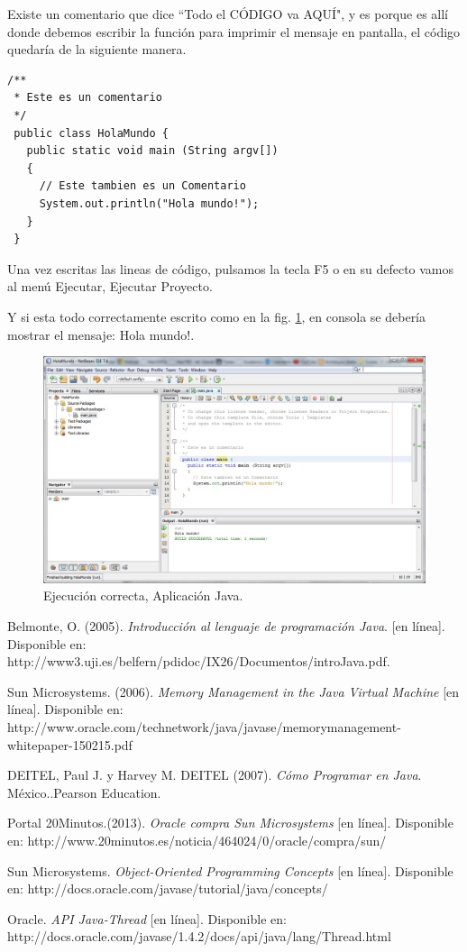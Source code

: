 \documentclass[12pt]{book} %
\begin{document}
Existe un comentario que dice ``Todo el CÓDIGO va AQUÍ", y es porque es allí donde debemos escribir la función para imprimir el mensaje en pantalla, el código quedaría de la siguiente manera.

\noindent
%
\begin{lstlisting}[frame=single]
/**
 * Este es un comentario
 */
 public class HolaMundo {
   public static void main (String argv[])
   {
     // Este tambien es un Comentario
     System.out.println("Hola mundo!");
   }
 }
\end{lstlisting}

Una vez escritas las lineas de código, pulsamos la tecla F5 o en su defecto vamos al menú Ejecutar, Ejecutar Proyecto.

Y si esta todo correctamente escrito como en la fig. \ref{hw04}, en consola se debería mostrar el mensaje: Hola mundo!.

	\begin{figure}[h]
		\centering
			\includegraphics[width=16cm]{Hola_mundo_004.jpg}
			\caption{Ejecución correcta, Aplicación Java.}
			\label{hw04}
	\end{figure}
	
\begin{thebibliography}{99}
 Belmonte, O. (2005). \textsl{Introducción al lenguaje de programación Java}. [en línea]. Disponible en: http://www3.uji.es/belfern/pdidoc/IX26/Documentos/introJava.pdf.

 Sun Microsystems. (2006). \textsl{Memory Management in the Java Virtual Machine} [en línea]. Disponible en: http://www.oracle.com/technetwork/java/javase/memorymanagement-whitepaper-150215.pdf

\bibitem DEITEL, Paul J. y Harvey M. DEITEL (2007). \textsl{Cómo Programar en Java}. México..Pearson Education. 

\bibitem Portal 20Minutos.(2013). \textsl{Oracle compra Sun Microsystems} [en línea]. Disponible en: http://www.20minutos.es/noticia/464024/0/oracle/compra/sun/

 Sun Microsystems. \textsl{Object-Oriented Programming Concepts} [en línea]. Disponible en: http://docs.oracle.com/javase/tutorial/java/concepts/

 Oracle. \textsl{API Java-Thread} [en línea]. Disponible en: http://docs.oracle.com/javase/1.4.2/docs/api/java/lang/Thread.html

\end{thebibliography}
\end{document}
